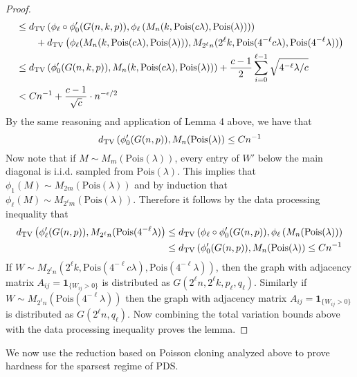 \documentclass[11pt]{article}
\begin{document}
\begin{proof}
\begin{align*}
&\le d_{\text{TV}}\left( \phi_\ell \circ \phi_0'(G(n, k, p)), \phi_\ell \left( M_n(k, \text{Pois}(c\lambda), \text{Pois}(\lambda)) \right) \right) \\
&\quad \quad + d_{\text{TV}}\left( \phi_{\ell}(M_n(k, \text{Pois}(c\lambda), \text{Pois}(\lambda))), M_{2^{\ell} n}(2^{\ell} k, \text{Pois}(4^{-\ell} c\lambda), \text{Pois}(4^{-\ell}\lambda)) \right) \\
&\le d_{\text{TV}}\left( \phi_0'(G(n, k, p)), M_n(k, \text{Pois}(c\lambda), \text{Pois}(\lambda)) \right) + \frac{c-1}{2} \sum_{i = 0}^{\ell - 1} \sqrt{4^{-\ell} \lambda/c} \\
&< Cn^{-1} + \frac{c - 1}{\sqrt{c}} \cdot n^{-\epsilon/2}
\end{align*}
By the same reasoning and application of Lemma 4 above, we have that
$$d_{\text{TV}}\left( \phi_0'(G(n, p)), M_n(\text{Pois}(\lambda) \right) \le Cn^{-1}$$
Now note that if $M \sim M_m(\text{Pois}(\lambda))$, every entry of $W'$ below the main diagonal is i.i.d. sampled from $\text{Pois}(\lambda)$. This implies that $\phi_1(M) \sim M_{2m}(\text{Pois}(\lambda))$ and by induction that $\phi_\ell(M) \sim M_{2^\ell m}(\text{Pois}(\lambda))$. Therefore it follows by the data processing inequality that
\begin{align*}
d_{\text{TV}}\left( \phi_\ell'(G(n, p)), M_{2^\ell n}(\text{Pois}(4^{-\ell} \lambda) \right) &\le d_{\text{TV}}\left( \phi_\ell \circ \phi_0'(G(n, p)), \phi_\ell\left(M_n(\text{Pois}(\lambda)\right) \right) \\
&\le d_{\text{TV}}\left( \phi_0'(G(n, p)), M_n(\text{Pois}(\lambda) \right) \le Cn^{-1}
\end{align*}
If $W \sim M_{2^{\ell} n}(2^{\ell} k, \text{Pois}(4^{-\ell} c\lambda), \text{Pois}(4^{-\ell}\lambda))$, then the graph with adjacency matrix $A_{ij} = \mathbf{1}_{\{W_{ij} > 0\}}$ is distributed as $G(2^\ell n, 2^\ell k, p_\ell, q_\ell)$. Similarly if $W \sim M_{2^{\ell} n}(\text{Pois}(4^{-\ell}\lambda))$ then the graph with adjacency matrix $A_{ij} = \mathbf{1}_{\{W_{ij} > 0\}}$ is distributed as $G(2^\ell n, q_\ell)$. Now combining the total variation bounds above with the data processing inequality proves the lemma.
\end{proof}

We now use the reduction based on Poisson cloning analyzed above to prove hardness for the sparsest regime of PDS.
\end{document}
